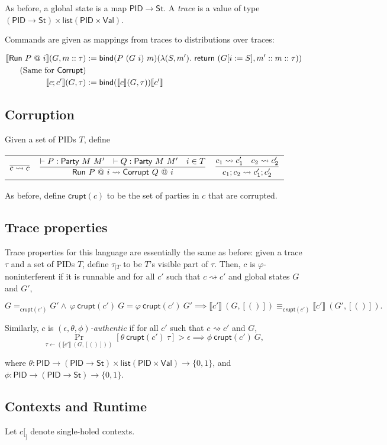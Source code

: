 \documentclass{article}
\newcommand{\Val}{\mathsf{Val}}
\newcommand{\St}{\mathsf{St}}
\newcommand{\PID}{\mathsf{PID}}
\renewcommand{\list}{\mathsf{list}}
\begin{document}
As before, a global state is a map $\PID \to \St$. A \emph{trace} is a value of type $(\PID \to \St) \times \list (\PID \times \Val)$.

Commands are given as mappings from traces to distributions over traces:

\begin{align*}
    \llbracket \textsf{Run}\ P\ @\ i \rrbracket (G, m :: \tau) &:= \mathsf{bind} (P\ (G\ i)\ m) (\lambda (S, m').\ \mathsf{return}\ (G[i := S], m' :: m :: \tau)) \\
    \text{(Same for \textsf{Corrupt})} \\
    \llbracket c; c' \rrbracket (G, \tau) &:= \mathsf{bind} (\llbracket c \rrbracket (G, \tau)) \llbracket c' \rrbracket
\end{align*}

\subsection{Corruption}

Given a set of PIDs $T$, define

\begin{tabular}{ccc}
    $\infer{c \rightsquigarrow c}{}$ &
    $\infer{\textsf{Run}\ P\ @\ i \rightsquigarrow \textsf{Corrupt}\ Q\ @\ i}{\vdash P : \textsf{Party}\ M\ M' & \vdash Q : \textsf{Party}\ M\ M' & i \in T}$ &
    $\infer{c_1; c_2 \rightsquigarrow c'_1; c'_2}{c_1 \rightsquigarrow c'_1 & c_2 \rightsquigarrow c'_2}$
\end{tabular}


As before, define $\mathsf{crupt}(c)$ to be the set of parties in $c$ that are corrupted.

\subsection{Trace properties}

Trace properties for this language are essentially the same as before: given a trace $\tau$ and a set of PIDs $T$, define $\tau_{| T}$ to be $T$'s visible part of $\tau$. Then, $c$ is $\varphi$-noninterferent if it is runnable and for all $c'$ such that $c \rightsquigarrow c'$ and global states $G$ and $G'$,

\[ G=_{\mathsf{crupt}(c')}G' \wedge\ \varphi\ \mathsf{crupt}(c')\ G = \varphi\ \mathsf{crupt}(c')\ G' \implies \llbracket c' \rrbracket\ (G, [()]) \equiv_{\mathsf{crupt}(c')} \llbracket c' \rrbracket\ (G', [()]).\]

Similarly, $c$ is \emph{$(\epsilon, \theta, \phi)$-authentic} if for all $c'$ such that $c \rightsquigarrow c'$ and $G$,
\[ \Pr_{\tau \leftarrow (\llbracket c' \rrbracket\ (G, [()]))}[\theta\ \mathsf{crupt}(c')\ \tau] > \epsilon \implies \phi\ \mathsf{crupt}(c')\ G,\]

where $\theta : \PID \to (\PID \to \St) \times \list (\PID \times \Val) \to \{0,1\}$, and $\phi : \PID \to (\PID \to \St) \to \{0,1\}$.

\subsection{Contexts and Runtime}

Let $c[_]$ denote single-holed contexts.
\end{document}
